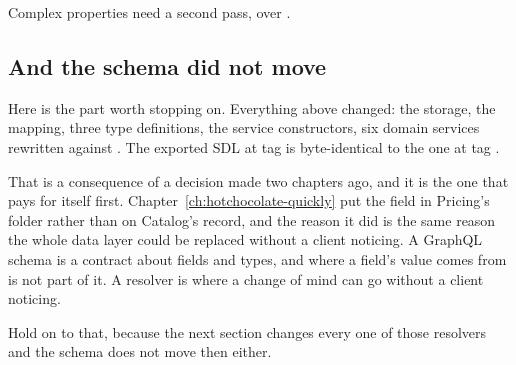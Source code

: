 Complex properties need a second pass, over .

\subsection*{And the schema did not move}

%
Here is the part worth stopping on. Everything above changed: the storage, the
mapping, three type definitions, the service constructors, six domain services
rewritten against . The exported SDL at tag  is
byte-identical to the one at tag .

That is a consequence of a decision made two chapters ago, and it is the one
that pays for itself first. Chapter~\ref{ch:hotchocolate-quickly}
put the  field in Pricing's folder rather than on Catalog's
 record, and the reason it did is the same reason the whole data
layer could be replaced without a client noticing. A GraphQL
schema is a contract about fields and types, and where a field's value comes
from is not part of it. A resolver is where a change of mind can go without a
client noticing.

Hold on to that, because the next section changes every one of those resolvers
and the schema does not move then either.
